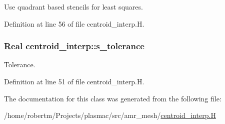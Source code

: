 Use quadrant based stencils for least squares. 



Definition at line 56 of file centroid\+\_\+interp.\+H.

\subsubsection[{\texorpdfstring{s\+\_\+tolerance}{s_tolerance}}]{\setlength{\rightskip}{0pt plus 5cm}Real centroid\+\_\+interp\+::s\+\_\+tolerance\hspace{0.3cm}{\ttfamily [static]}}\hypertarget{classcentroid__interp_aa83bc7a563431519729733f523d48edf}{}\label{classcentroid__interp_aa83bc7a563431519729733f523d48edf}


Tolerance. 



Definition at line 51 of file centroid\+\_\+interp.\+H.



The documentation for this class was generated from the following file\+:\begin{DoxyCompactItemize}
\item 
/home/robertm/\+Projects/plasmac/src/amr\+\_\+mesh/\hyperlink{centroid__interp_8H}{centroid\+\_\+interp.\+H}\end{DoxyCompactItemize}
